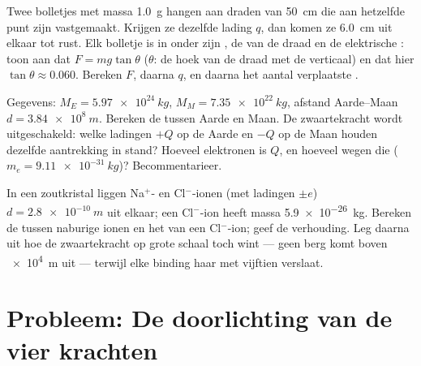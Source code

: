 \begin{exercise}[$\star\star\star$]\label{exo:g11:fundamental-interactions:13}
Twee bolletjes met massa \qty{1.0}{g} hangen aan draden van \qty{50}{cm}
die aan hetzelfde punt zijn vastgemaakt. Krijgen ze dezelfde lading $q$,
dan komen ze \qty{6.0}{cm} uit elkaar tot rust. Elk bolletje is in
 onder zijn , de  van de draad en de
elektrische : toon aan dat $F = mg\tan\theta$ ($\theta$: de hoek
van de draad met de verticaal) en dat hier $\tan\theta \approx 0.060$.
Bereken $F$, daarna $q$, en daarna het aantal verplaatste .
\end{exercise}

\begin{exercise}[$\star\star\star$]\label{exo:g11:fundamental-interactions:14}
Gegevens: $M_E = \qty{5.97e24}{kg}$, $M_M = \qty{7.35e22}{kg}$, afstand
Aarde--Maan $d = \qty{3.84e8}{m}$. Bereken de  tussen
Aarde en Maan. De zwaartekracht wordt uitgeschakeld: welke ladingen $+Q$
op de Aarde en $-Q$ op de Maan houden dezelfde aantrekking in stand?
Hoeveel elektronen is $Q$, en hoeveel wegen die
($m_e = \qty{9.11e-31}{kg}$)? Becommentarieer.
\end{exercise}

\begin{exercise}[$\star\star\star$]\label{exo:g11:fundamental-interactions:15}
In een zoutkristal liggen Na$^{+}$- en Cl$^{-}$-ionen (met ladingen
$\pm e$) $d = \qty{2.8e-10}{m}$ uit elkaar; een Cl$^{-}$-ion heeft massa
\qty{5.9e-26}{kg}. Bereken de  tussen naburige ionen en het 
van een Cl$^{-}$-ion; geef de verhouding. Leg daarna uit hoe de
zwaartekracht op grote schaal toch wint --- geen berg komt boven
\qty{e4}{m} uit --- terwijl elke binding haar met vijftien 
verslaat.
\end{exercise}

\section{Probleem: De doorlichting van de vier krachten}

